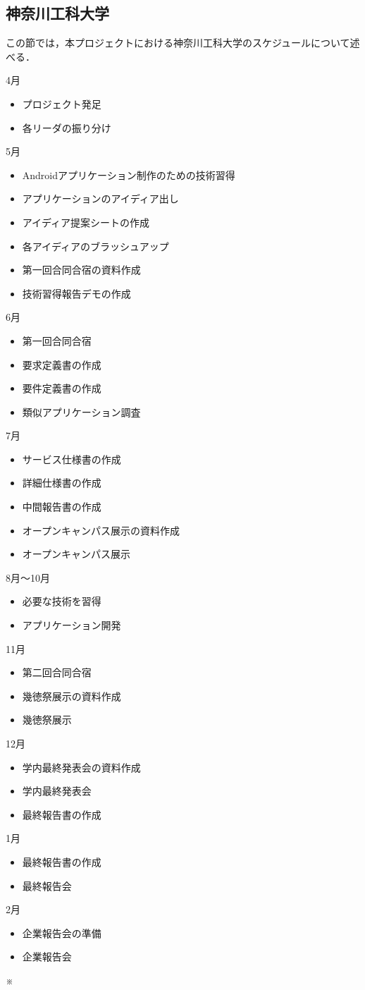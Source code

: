 \subsection{神奈川工科大学}
\par この節では，本プロジェクトにおける神奈川工科大学のスケジュールについて述べる．

4月
\begin{itemize}
\item プロジェクト発足
\item 各リーダの振り分け
\end{itemize}
5月
\begin{itemize}
\item Androidアプリケーション制作のための技術習得
\item アプリケーションのアイディア出し
\item アイディア提案シートの作成
\item 各アイディアのブラッシュアップ
\item 第一回合同合宿の資料作成
\item 技術習得報告デモの作成
\end{itemize}
6月
\begin{itemize}
\item 第一回合同合宿
\item 要求定義書の作成
\item 要件定義書の作成
\item 類似アプリケーション調査
\end{itemize}
7月
\begin{itemize}
\item サービス仕様書の作成
\item 詳細仕様書の作成
\item 中間報告書の作成
\item オープンキャンパス展示の資料作成
\item オープンキャンパス展示
\end{itemize}
8月～10月
\begin{itemize}
\item 必要な技術を習得
\item アプリケーション開発
\end{itemize}
11月
\begin{itemize}
\item 第二回合同合宿
\item 幾徳祭展示の資料作成
\item 幾徳祭展示
\end{itemize}
12月
\begin{itemize}
\item 学内最終発表会の資料作成
\item 学内最終発表会
\item 最終報告書の作成
\end{itemize}
1月
\begin{itemize}
\item 最終報告書の作成
\item 最終報告会
\end{itemize}
2月
\begin{itemize}
\item 企業報告会の準備
\item 企業報告会
\end{itemize}

※
